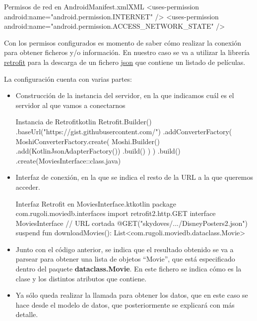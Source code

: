 \documentclass{\ClassPath/viu-tfm-template}
\begin{document}
\begin{mycode}{Permisos de red en AndroidManifest.xml}{XML}{{\small }}
<uses-permission android:name="android.permission.INTERNET" />
<uses-permission android:name="android.permission.ACCESS_NETWORK_STATE" />
\end{mycode}

Con los permisos configurados es momento de saber cómo realizar la conexión para obtener ficheros y/o información. En nuestro caso se va a utilizar la librería \href{https://github.com/square/retrofit}{retrofit} para la descarga de un fichero \href{https://gist.githubusercontent.com/skydoves/176c209dbce4a53c0ff9589e07255f30/raw/6489d9712702e093c4df71500fb822f0d408ef75/DisneyPosters2.json}{json} que contiene un listado de películas.

La configuración cuenta con varias partes:
\begin{itemize}
    \item Construcción de la instancia del servidor, en la que indicamos cuál es el servidor al que vamos a conectarnos
    \begin{mycode}{Instancia de Retrofit}{kotlin}{}
Retrofit.Builder()
    .baseUrl("https://gist.githubusercontent.com/")
    .addConverterFactory(
        MoshiConverterFactory.create(
            Moshi.Builder()
              .add(KotlinJsonAdapterFactory())
              .build()
        )
    )
    .build()
    .create(MoviesInterface::class.java)
    \end{mycode}

    \item Interfaz de conexión, en la que se indica el resto de la URL a la que queremos acceder.
    \begin{mycode}{Interfaz Retrofit en MoviesInterface.kt}{kotlin}{}
package com.rugoli.moviedb.interfaces
import retrofit2.http.GET
interface MoviesInterface {
    // URL cortada
    @GET("skydoves/.../DisneyPosters2.json")
    suspend fun downloadMovies():
        List<com.rugoli.moviedb.dataclass.Movie>
}
\end{mycode}

    \item Junto con el código anterior, se indica que el resultado obtenido se va a parsear para obtener una lista de objetos “Movie”, que está especificado dentro del paquete \textbf{dataclass.Movie}. En este fichero se indica cómo es la clase y los distintos atributos que contiene.

    \item Ya sólo queda realizar la llamada para obtener los datos, que en este caso se hace desde el modelo de datos, que posteriormente se explicará con más detalle.
\end{itemize}
\end{document}
